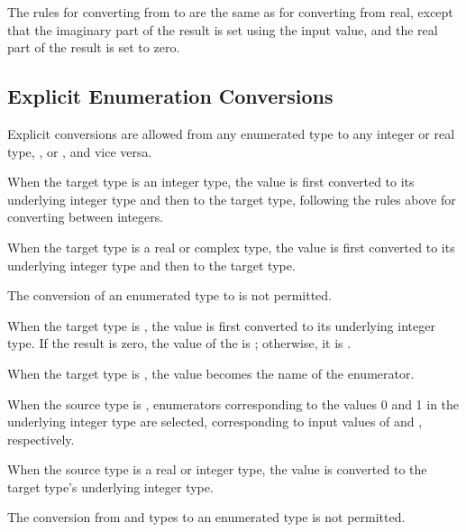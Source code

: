 The rules for converting from  to  are the same as for
converting from real, except that the imaginary part of the result is set using
the input value, and the real part of the result is set to zero.

\subsection{Explicit Enumeration Conversions}
\label{Explicit_Enumeration_Conversions}

Explicit conversions are allowed from any enumerated type to any
integer or real type, , or , and vice versa.

When the target type is an integer type, the value is first converted to its
underlying integer type and then to the target type, following the rules above
for converting between integers.

When the target type is a real or complex type, the value is first converted to
its underlying integer type and then to the target type.

The conversion of an enumerated type to  is not permitted.

When the target type is , the value is first converted to its
underlying integer type.  If the result is zero, the value of the 
is ; otherwise, it is .

When the target type is , the value becomes the name of the
enumerator.  %

When the source type is , enumerators corresponding to the values 0
and 1 in the underlying integer type are selected, corresponding to input values
of  and , respectively.


When the source type is a real or integer type, the value is converted to the
target type's underlying integer type.  

The conversion from  and  types to an enumerated type is not
permitted.

